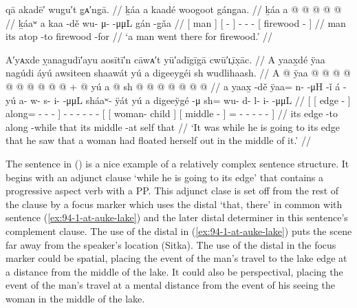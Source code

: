 \ex\label{ex:94-2-man-went-there-for-firewood}%
%
\begingl
	\glpreamble	qā akadē′ wugu′t g̣ᴀ′ng̣ā. //
	\glpreamble	ḵáa a kaadé woogoot gáng̱aa. //
	\gla	{} ḵáa {} {} a  @ {} {}
		 @ {} @ {} @ {}
		{}  @ {} {} //
	\glb	{} ḵáaʷ {} {} a kaa -dě {}
		wu- μ-  -μμL
		{} gán -g̱ǎa {} //
	\glc	{}[ man {}] {}[   - {}]
		- -  -
		{}[ firewood - {}] //
	\gld	{} man {} {} its atop -to {}
		 {} {} {}
		{} firewood -for {} //
	\glft	‘a man went there for firewood.’
		//
\endgl
\xe

\ex\label{ex:94-3-going-edge-woman-floating-middle}%
%
\begingl
	\glpreamble	A′yᴀxde ỵanagudī′ayu aosītī′n cāwᴀ′t yū′adīgīgā cwū′ʟ̣īx̣āc. //
	\glpreamble	A yaax̱dé ÿaa nagúdi áyú awsiteen shaawát yú a digeeygéi sh wudlihaash. //
	\gla	{} {} A  @ {} {}
			ÿaa @  @ {} @ {} @ {} {}
			 @ {}
		 @ {} @ {} @ {} @ {} @ {} +
		{} {}  @ {} {}
			{} yú a  @ {} {}
			sh @  @ {} @ {} @ {} @ {} @ {} @ {} {}  //
	\glb	{} {} a yaax̱ -dě {} 
			ÿaa= n-  -μH -ǐ {}
			á -yú
		a- w- s- i-  -μμL
		{} {} sháaʷ- ÿát {}
			{} yú a digeeÿgé -μ {}
			sh= wu- d- l- i-  -μμL {} {} //
	\glc	{}[ {}[  edge - {}]
			along= -  - - {}]
			 -
		- - - -  -
		{}[ {}[ woman- child {}]
			{}[   middle - {}]
			= - - - -
				 - \· {}] //
	\gld	{} {} its edge -to {}
			along  {} {} -while {}
			 {} 
		 {} {} {} {} {} 
		{} {}  {} {} 
			{} that its middle -at {}
			self  {} {} {} {} \·that {} //
	\glft	‘It was while he is going to its edge that he saw that a woman had floated herself out in the middle of it.’
		//
\endgl
\xe

The sentence in (\lastx) is a nice example of a relatively complex sentence structure.
It begins with an adjunct clause  ‘while he is going to its edge’ that contains a progressive aspect verb with a PP.
This adjunct clase is set off from the rest of the clause by a focus marker  which uses the distal  ‘that, there’ in common with sentence (\ref{ex:94-1-at-auke-lake}) and the later distal determiner in this sentence’s complement clause.
The use of the distal in (\ref{ex:94-1-at-auke-lake}) puts the scene far away from the speaker’s location (Sitka).
The use of the distal in the focus marker could be spatial, placing the event of the man’s travel to the lake edge at a distance from the middle of the lake.
It could also be perspectival, placing the event of the man’s travel at a mental distance from the event of his seeing the woman in the middle of the lake.

